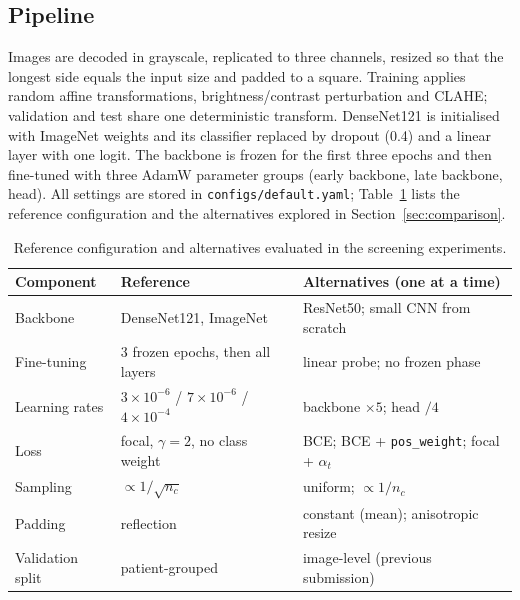 \documentclass[12pt,letterpaper]{article}
\begin{document}
\subsection{Pipeline}
Images are decoded in grayscale, replicated to three channels, resized so that the
longest side equals the input size and padded to a square. Training applies random
affine transformations, brightness/contrast perturbation and CLAHE; validation and
test share one deterministic transform. DenseNet121 is initialised with ImageNet
weights and its classifier replaced by dropout (0.4) and a linear layer with one
logit. The backbone is frozen for the first three epochs and then fine-tuned with
three AdamW parameter groups (early backbone, late backbone, head). All settings are
stored in \texttt{configs/default.yaml}; Table~\ref{tab:config} lists the reference
configuration and the alternatives explored in Section~\ref{sec:comparison}.

\begin{table}[htbp]
\centering
\caption{Reference configuration and alternatives evaluated in the screening experiments.}
\label{tab:config}
\small
\begin{tabular}{lll}
\toprule
Component & Reference & Alternatives (one at a time) \\
\midrule
Backbone & DenseNet121, ImageNet & ResNet50; small CNN from scratch \\
Fine-tuning & 3 frozen epochs, then all layers & linear probe; no frozen phase \\
Learning rates & $3{\times}10^{-6}$ / $7{\times}10^{-6}$ / $4{\times}10^{-4}$ & backbone $\times5$; head $/4$ \\
Loss & focal, $\gamma=2$, no class weight & BCE; BCE + \texttt{pos\_weight}; focal + $\alpha_t$ \\
Sampling & $\propto 1/\sqrt{n_c}$ & uniform; $\propto 1/n_c$ \\
Padding & reflection & constant (mean); anisotropic resize \\
Validation split & patient-grouped & image-level (previous submission) \\
\bottomrule
\end{tabular}
\end{table}
\end{document}
